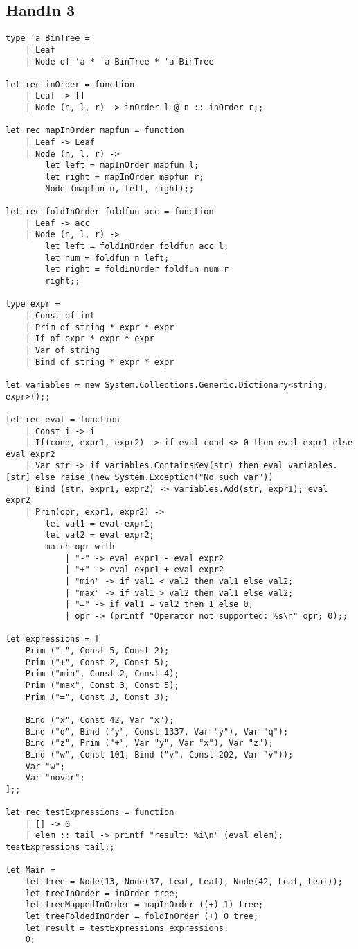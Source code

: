 \subsection{HandIn 3}
\label{Appendix_FSharp_Ulrik_3}
\begin{lstlisting}
type 'a BinTree =
    | Leaf
    | Node of 'a * 'a BinTree * 'a BinTree

let rec inOrder = function
    | Leaf -> []
    | Node (n, l, r) -> inOrder l @ n :: inOrder r;;
    
let rec mapInOrder mapfun = function
    | Leaf -> Leaf
    | Node (n, l, r) -> 
        let left = mapInOrder mapfun l;
        let right = mapInOrder mapfun r;
        Node (mapfun n, left, right);;
        
let rec foldInOrder foldfun acc = function
    | Leaf -> acc
    | Node (n, l, r) ->
        let left = foldInOrder foldfun acc l;
        let num = foldfun n left;
        let right = foldInOrder foldfun num r
        right;;
        
type expr = 
    | Const of int
    | Prim of string * expr * expr
    | If of expr * expr * expr
    | Var of string
    | Bind of string * expr * expr
    
let variables = new System.Collections.Generic.Dictionary<string, expr>();;

let rec eval = function
    | Const i -> i
    | If(cond, expr1, expr2) -> if eval cond <> 0 then eval expr1 else eval expr2
    | Var str -> if variables.ContainsKey(str) then eval variables.[str] else raise (new System.Exception("No such var"))
    | Bind (str, expr1, expr2) -> variables.Add(str, expr1); eval expr2
    | Prim(opr, expr1, expr2) ->
        let val1 = eval expr1;
        let val2 = eval expr2;
        match opr with
            | "-" -> eval expr1 - eval expr2
            | "+" -> eval expr1 + eval expr2
            | "min" -> if val1 < val2 then val1 else val2;
            | "max" -> if val1 > val2 then val1 else val2;
            | "=" -> if val1 = val2 then 1 else 0;
            | opr -> (printf "Operator not supported: %s\n" opr; 0);;

let expressions = [
    Prim ("-", Const 5, Const 2);
    Prim ("+", Const 2, Const 5);
    Prim ("min", Const 2, Const 4);
    Prim ("max", Const 3, Const 5);
    Prim ("=", Const 3, Const 3);
    
    Bind ("x", Const 42, Var "x");
    Bind ("q", Bind ("y", Const 1337, Var "y"), Var "q");
    Bind ("z", Prim ("+", Var "y", Var "x"), Var "z");
    Bind ("w", Const 101, Bind ("v", Const 202, Var "v"));
    Var "w";
    Var "novar";
];;

let rec testExpressions = function
    | [] -> 0
    | elem :: tail -> printf "result: %i\n" (eval elem); testExpressions tail;;

let Main = 
    let tree = Node(13, Node(37, Leaf, Leaf), Node(42, Leaf, Leaf));
    let treeInOrder = inOrder tree;
    let treeMappedInOrder = mapInOrder ((+) 1) tree;
    let treeFoldedInOrder = foldInOrder (+) 0 tree;
    let result = testExpressions expressions;
    0;
\end{lstlisting}
